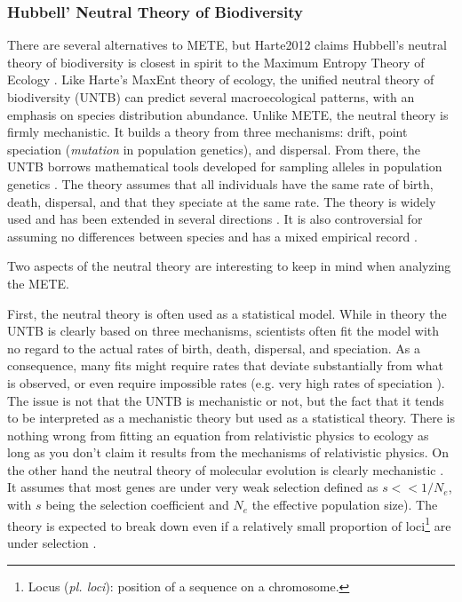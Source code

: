 \documentclass[letterpaper,12pt]{article}
\begin{document}
\subsubsection{Hubbell' Neutral Theory of Biodiversity}

There are several alternatives to METE, but Harte2012 claims Hubbell's
neutral theory of biodiversity \cite {hub01,lei07,ros11b} is closest in
spirit to the Maximum Entropy Theory of Ecology \cite[p. 208]{har12}. Like
Harte's MaxEnt theory of ecology, the unified neutral theory of biodiversity
(UNTB) can predict several macroecological patterns, with an emphasis on
species distribution abundance. Unlike METE, the neutral theory is firmly
mechanistic. It builds a theory from three mechanisms: drift, point
speciation (\emph{mutation} in population genetics), and dispersal. From
there, the UNTB borrows mathematical tools developed for sampling alleles in
population genetics \cite{mor62,ewe72}. The theory assumes that all
individuals have the same rate of birth, death, dispersal, and that they
speciate at the same rate. The theory is widely used and has been extended
in several directions \cite{all09,alo06,eti07,vol03,zho08}. It is also
controversial for assuming no differences between species \cite{cla09,pur10}
and has a mixed empirical record \cite{don06,mcg03,ric03,mcg06b}.

Two aspects of the neutral theory are interesting to keep in mind when
analyzing the METE.

First, the neutral theory is often used as a statistical model. While in
theory the UNTB is clearly based on three mechanisms, scientists often fit
the model with no regard to the actual rates of birth, death, dispersal, and
speciation. As a consequence, many fits might require rates that deviate
substantially from what is observed, or even require impossible rates (e.g.
very high rates of speciation \cite{des11}). The issue is not that the UNTB
is mechanistic or not, but the fact that it tends to be interpreted as a
mechanistic theory but used as a statistical theory. There is nothing wrong
from fitting an equation from relativistic physics to ecology as long as you
don't claim it results from the mechanisms of relativistic physics. On the
other hand the neutral theory of molecular evolution is clearly mechanistic
\cite {kim68,kin69}. It assumes that most genes are under very weak
selection defined as $s << 1/N_{e}$, with $s$ being the selection
coefficient and $N_{e}$ the effective population size). The theory is
expected to break down even if a relatively small proportion of loci\footnote
{Locus (\emph{pl. loci}): position of a sequence on a chromosome.} are
under selection \cite {kim83,gil91}.
\end{document}
